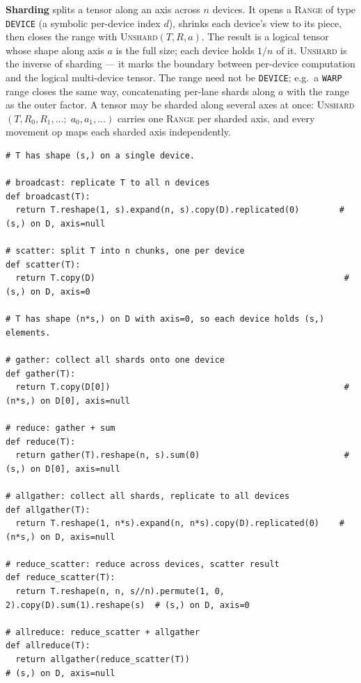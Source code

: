 \documentclass[10pt,letterpaper]{article}
\newcommand{\op}[1]{\textsc{#1}}
\begin{document}
\textbf{Sharding} splits a tensor along an axis across $n$ devices. It opens a \op{Range} of type \texttt{DEVICE} (a symbolic per-device index $d$), shrinks each device's view to its piece, then closes the range with \op{Unshard}$(T, R, a)$. The result is a logical tensor whose shape along axis $a$ is the full size; each device holds $1/n$ of it. \op{Unshard} is the inverse of sharding --- it marks the boundary between per-device computation and the logical multi-device tensor. The range need not be \texttt{DEVICE}; e.g.\ a \texttt{WARP} range closes the same way, concatenating per-lane shards along $a$ with the range as the outer factor. A tensor may be sharded along several axes at once: \op{Unshard}$(T, R_0, R_1, \ldots;\; a_0, a_1, \ldots)$ carries one \op{Range} per sharded axis, and every movement op maps each sharded axis independently.

\begin{lstlisting}
# T has shape (s,) on a single device.

# broadcast: replicate T to all n devices
def broadcast(T):
  return T.reshape(1, s).expand(n, s).copy(D).replicated(0)        # (s,) on D, axis=null

# scatter: split T into n chunks, one per device
def scatter(T):
  return T.copy(D)                                                  # (s,) on D, axis=0

# T has shape (n*s,) on D with axis=0, so each device holds (s,) elements.

# gather: collect all shards onto one device
def gather(T):
  return T.copy(D[0])                                               # (n*s,) on D[0], axis=null

# reduce: gather + sum
def reduce(T):
  return gather(T).reshape(n, s).sum(0)                             # (s,) on D[0], axis=null

# allgather: collect all shards, replicate to all devices
def allgather(T):
  return T.reshape(1, n*s).expand(n, n*s).copy(D).replicated(0)    # (n*s,) on D, axis=null

# reduce_scatter: reduce across devices, scatter result
def reduce_scatter(T):
  return T.reshape(n, n, s//n).permute(1, 0, 2).copy(D).sum(1).reshape(s)  # (s,) on D, axis=0

# allreduce: reduce_scatter + allgather
def allreduce(T):
  return allgather(reduce_scatter(T))                                       # (s,) on D, axis=null
\end{lstlisting}

\end{document}

